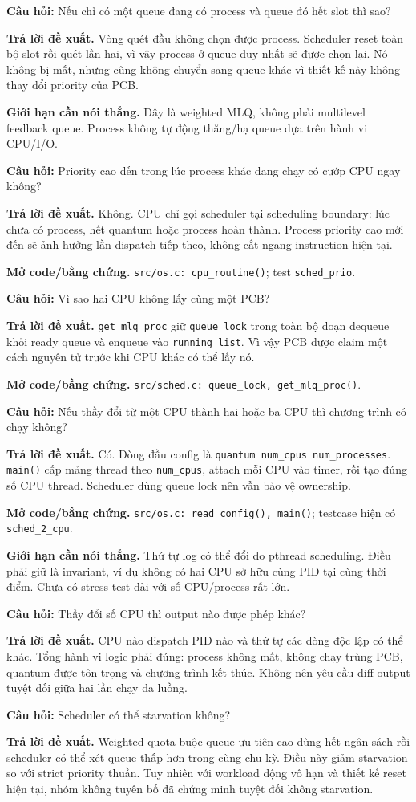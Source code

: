 \documentclass[11pt,a4paper]{article}
\newcommand{\code}[1]{\texttt{\color{navy}#1}}
\newcommand{\q}[1]{%
  \vspace{0.55em}\noindent
  \colorbox{pale}{\parbox{\dimexpr\textwidth-2\fboxsep}{\textbf{\color{navy}Câu hỏi:} #1}}%
  \par\vspace{0.3em}}
\newcommand{\ans}[1]{\textbf{\color{cyan}Trả lời đề xuất.} #1\par}
\newcommand{\proofcode}[1]{\textbf{\color{orange}Mở code/bằng chứng.} #1\par}
\newcommand{\limitanswer}[1]{\textbf{\color{red}Giới hạn cần nói thẳng.} #1\par}
\begin{document}
\q{Nếu chỉ có một queue đang có process và queue đó hết slot thì sao?}
\ans{Vòng quét đầu không chọn được process. Scheduler reset toàn bộ slot rồi
quét lần hai, vì vậy process ở queue duy nhất sẽ được chọn lại. Nó không bị mất,
nhưng cũng không chuyển sang queue khác vì thiết kế này không thay đổi priority
của PCB.}
\limitanswer{Đây là weighted MLQ, không phải multilevel feedback queue. Process
không tự động thăng/hạ queue dựa trên hành vi CPU/I/O.}

\q{Priority cao đến trong lúc process khác đang chạy có cướp CPU ngay không?}
\ans{Không. CPU chỉ gọi scheduler tại scheduling boundary: lúc chưa có process,
hết quantum hoặc process hoàn thành. Process priority cao mới đến sẽ ảnh hưởng
lần dispatch tiếp theo, không cắt ngang instruction hiện tại.}
\proofcode{\code{src/os.c: cpu\_routine()}; test \code{sched\_prio}.}

\q{Vì sao hai CPU không lấy cùng một PCB?}
\ans{\code{get\_mlq\_proc} giữ \code{queue\_lock} trong toàn bộ đoạn dequeue
khỏi ready queue và enqueue vào \code{running\_list}. Vì vậy PCB được claim một
cách nguyên tử trước khi CPU khác có thể lấy nó.}
\proofcode{\code{src/sched.c: queue\_lock, get\_mlq\_proc()}.}

\q{Nếu thầy đổi từ một CPU thành hai hoặc ba CPU thì chương trình có chạy không?}
\ans{Có. Dòng đầu config là \code{quantum num\_cpus num\_processes}.
\code{main()} cấp mảng thread theo \code{num\_cpus}, attach mỗi CPU vào timer,
rồi tạo đúng số CPU thread. Scheduler dùng queue lock nên vẫn bảo vệ ownership.}
\proofcode{\code{src/os.c: read\_config(), main()}; testcase hiện có
\code{sched\_2\_cpu}.}
\limitanswer{Thứ tự log có thể đổi do pthread scheduling. Điều phải giữ là
invariant, ví dụ không có hai CPU sở hữu cùng PID tại cùng thời điểm. Chưa có
stress test dài với số CPU/process rất lớn.}

\q{Thầy đổi số CPU thì output nào được phép khác?}
\ans{CPU nào dispatch PID nào và thứ tự các dòng độc lập có thể khác. Tổng hành
vi logic phải đúng: process không mất, không chạy trùng PCB, quantum được tôn
trọng và chương trình kết thúc. Không nên yêu cầu diff output tuyệt đối giữa hai
lần chạy đa luồng.}

\q{Scheduler có thể starvation không?}
\ans{Weighted quota buộc queue ưu tiên cao dùng hết ngân sách rồi scheduler có
thể xét queue thấp hơn trong cùng chu kỳ. Điều này giảm starvation so với strict
priority thuần. Tuy nhiên với workload động vô hạn và thiết kế reset hiện tại,
nhóm không tuyên bố đã chứng minh tuyệt đối không starvation.}
\end{document}
